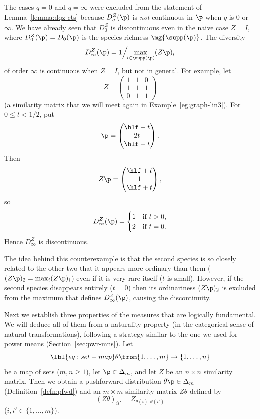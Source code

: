 \begin{remark}
The cases $q = 0$ and $q = \infty$ were excluded from the
statement of Lemma~\ref{lemma:dqz-cts} because
$D_q^Z(\p)$ is \emph{not} continuous in $\p$ when $q$ is $0$ or $\infty$.
We have already seen that $D_0^Z$ is discontinuous even in the
naive case $Z = I$, where $D_0^Z(\p) = D_0(\p)$ is the species richness
$\mg{\supp(\p)}$.  The diversity
\[
D_\infty^Z(\p) = 1\Big/\!\!\max_{i \in \supp(\p)} (Z\p)_i
\]
of order $\infty$ is continuous when $Z = I$, but not in general.
For example, let
\[
Z = 
\begin{pmatrix}
1       &1      &0      \\
1       &1      &1      \\
0       &1      &1
\end{pmatrix}
\]
(a similarity matrix that we will meet again in
Example~\ref{eg:graph-lin3}).  For $0 \leq t < 1/2$, put
\[
\p
=
\begin{pmatrix}
\hlf - t \\
2t      \\
\hlf - t
\end{pmatrix}.
\]
Then
\[
Z\p
=
\begin{pmatrix}
\hlf + t \\
1       \\
\hlf + t 
\end{pmatrix},
\]
so 
\[
D_\infty^Z(\p)
=
\begin{cases}
1       &\text{if } t > 0,      \\
2       &\text{if } t = 0.
\end{cases}
\]
Hence $D_\infty^Z$ is discontinuous. 

The idea behind this counterexample is that the second species is so
closely related to the other two that it appears more ordinary than them
($(Z\p)_2 = \max_i (Z\p)_i$) even if it
is very rare itself ($t$ is small).  However, if the second species
disappears entirely ($t = 0$) then its ordinariness $(Z\p)_2$ is excluded
from the maximum that defines $D_\infty^Z(\p)$, causing the discontinuity.
\end{remark}

Next we establish three properties of the measures that are logically%
% 
% 
fundamental.  We will deduce all of them from a naturality property (in the
categorical sense of natural transformations), following a strategy similar
to the one we used for power means (Section~\ref{sec:pwr-mns}).  Let
% 
\begin{equation}
\lbl{eq:set-map}
\theta \from \{1, \ldots, m\} \to \{1, \ldots, n\}  
\end{equation}
% 
be a map of sets ($m, n \geq 1$), let $\p \in \Delta_m$, and let $Z$ be an
$n \times n$ similarity matrix.  Then we obtain a pushforward distribution
$\theta \p \in \Delta_m$ (Definition~\ref{defn:pfwd}) and an $m \times m$
similarity matrix $Z\theta$ defined by
\[
(Z\theta)_{i i'} = Z_{\theta(i), \theta(i')}
\]
($i, i' \in \{1, \ldots, m\}$).  

